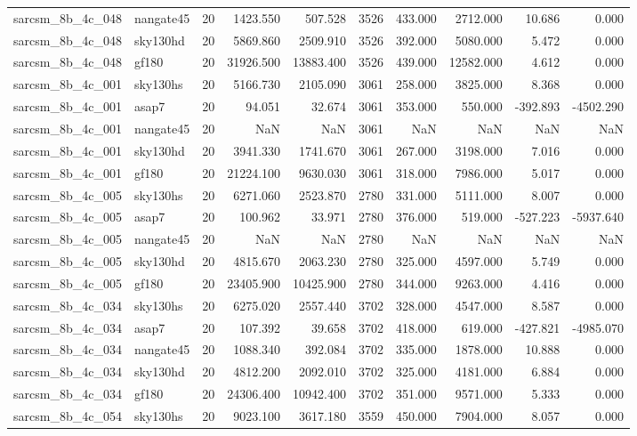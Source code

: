\documentclass{article}
\begin{document}
\begin{longtable}{llrrrrrrrr}
sarcsm\_8b\_4c\_048 & nangate45 & 20 & 1423.550 & 507.528 & 3526 & 433.000 & 2712.000 & 10.686 & 0.000 \\
sarcsm\_8b\_4c\_048 & sky130hd & 20 & 5869.860 & 2509.910 & 3526 & 392.000 & 5080.000 & 5.472 & 0.000 \\
sarcsm\_8b\_4c\_048 & gf180 & 20 & 31926.500 & 13883.400 & 3526 & 439.000 & 12582.000 & 4.612 & 0.000 \\
sarcsm\_8b\_4c\_001 & sky130hs & 20 & 5166.730 & 2105.090 & 3061 & 258.000 & 3825.000 & 8.368 & 0.000 \\
sarcsm\_8b\_4c\_001 & asap7 & 20 & 94.051 & 32.674 & 3061 & 353.000 & 550.000 & -392.893 & -4502.290 \\
sarcsm\_8b\_4c\_001 & nangate45 & 20 & NaN & NaN & 3061 & NaN & NaN & NaN & NaN \\
sarcsm\_8b\_4c\_001 & sky130hd & 20 & 3941.330 & 1741.670 & 3061 & 267.000 & 3198.000 & 7.016 & 0.000 \\
sarcsm\_8b\_4c\_001 & gf180 & 20 & 21224.100 & 9630.030 & 3061 & 318.000 & 7986.000 & 5.017 & 0.000 \\
sarcsm\_8b\_4c\_005 & sky130hs & 20 & 6271.060 & 2523.870 & 2780 & 331.000 & 5111.000 & 8.007 & 0.000 \\
sarcsm\_8b\_4c\_005 & asap7 & 20 & 100.962 & 33.971 & 2780 & 376.000 & 519.000 & -527.223 & -5937.640 \\
sarcsm\_8b\_4c\_005 & nangate45 & 20 & NaN & NaN & 2780 & NaN & NaN & NaN & NaN \\
sarcsm\_8b\_4c\_005 & sky130hd & 20 & 4815.670 & 2063.230 & 2780 & 325.000 & 4597.000 & 5.749 & 0.000 \\
sarcsm\_8b\_4c\_005 & gf180 & 20 & 23405.900 & 10425.900 & 2780 & 344.000 & 9263.000 & 4.416 & 0.000 \\
sarcsm\_8b\_4c\_034 & sky130hs & 20 & 6275.020 & 2557.440 & 3702 & 328.000 & 4547.000 & 8.587 & 0.000 \\
sarcsm\_8b\_4c\_034 & asap7 & 20 & 107.392 & 39.658 & 3702 & 418.000 & 619.000 & -427.821 & -4985.070 \\
sarcsm\_8b\_4c\_034 & nangate45 & 20 & 1088.340 & 392.084 & 3702 & 335.000 & 1878.000 & 10.888 & 0.000 \\
sarcsm\_8b\_4c\_034 & sky130hd & 20 & 4812.200 & 2092.010 & 3702 & 325.000 & 4181.000 & 6.884 & 0.000 \\
sarcsm\_8b\_4c\_034 & gf180 & 20 & 24306.400 & 10942.400 & 3702 & 351.000 & 9571.000 & 5.333 & 0.000 \\
sarcsm\_8b\_4c\_054 & sky130hs & 20 & 9023.100 & 3617.180 & 3559 & 450.000 & 7904.000 & 8.057 & 0.000 \\

\end{longtable}
\end{document}
